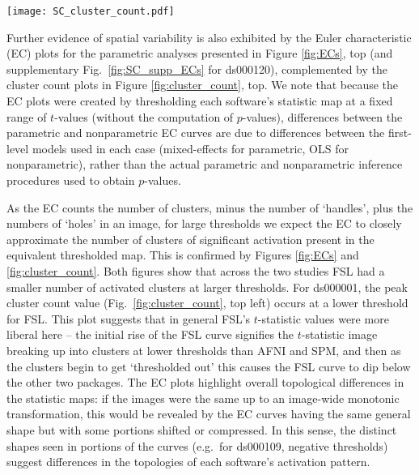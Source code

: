 \begin{sidewaysfigure}[htbp]
\centering
	\texttt{[image: SC\_cluster\_count.pdf]}	
\caption{Cluster count plots for ds000001 and ds000109. On top, comparisons of the number of cluster found in each software's $t$-statistic map from our reanalyses using a range of $t$-value thresholds between -6 and 6. Below, comparisons of the cluster counts calculated using the same thresholds on the corresponding $t$-statistic images for permutation inference within each package.}
\label{fig:cluster_count}
\end{sidewaysfigure}

Further evidence of spatial variability is also exhibited by the Euler characteristic (EC) plots for the parametric analyses presented in Figure \ref{fig:ECs}, top (and supplementary Fig.\ \ref{fig:SC_supp_ECs} for ds000120), complemented by the cluster count plots in Figure \ref{fig:cluster_count}, top. We note that because the EC plots were created by thresholding each software's statistic map at a fixed range of $t$-values (without the computation of $p$-values), differences between the parametric and nonparametric EC curves are due to differences between the first-level models used in each case (mixed-effects for parametric, OLS for nonparametric), rather than the actual parametric and nonparametric inference procedures used to obtain $p$-values.

As the EC counts the number of clusters, minus the number of `handles', plus the numbers of `holes' in an image, for large thresholds we expect the EC to closely approximate the number of clusters of significant activation present in the equivalent thresholded map. This is confirmed by Figures \ref{fig:ECs} and \ref{fig:cluster_count}. Both figures show that across the two studies FSL had a smaller number of activated clusters at larger thresholds. For ds000001, the peak cluster count value (Fig.\ \ref{fig:cluster_count}, top left) occurs at a lower threshold for FSL. This plot suggests that in general FSL's $t$-statistic values were more liberal here -- the initial rise of the FSL curve signifies the $t$-statistic image breaking up into clusters at lower thresholds than AFNI and SPM, and then as the clusters begin to get `thresholded out' this causes the FSL curve to dip below the other two packages. The EC plots highlight overall topological differences in the statistic maps: if the images were the same up to an image-wide monotonic transformation, this would be revealed by the EC curves having the same general shape but with some portions shifted or compressed. In this sense, the distinct shapes seen in portions of the curves (e.g.\ for ds000109, negative thresholds) suggest differences in the topologies of each software's activation pattern. 


